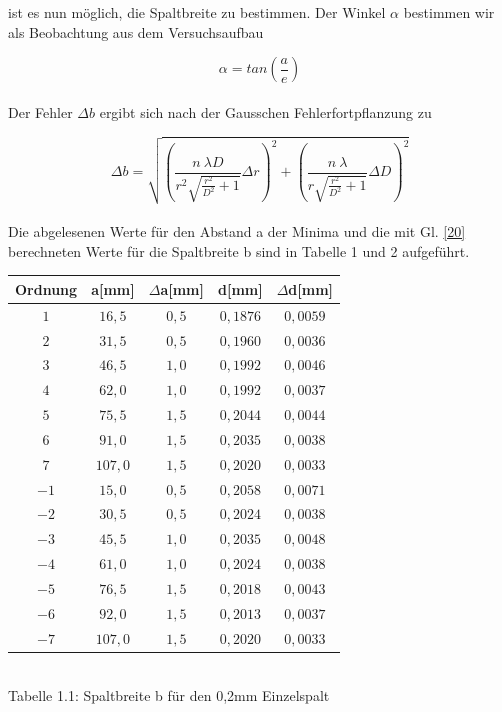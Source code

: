 \documentclass{article}
\begin{document}
 ist es nun möglich, die Spaltbreite zu bestimmen. Der Winkel \(\alpha \) bestimmen wir als Beobachtung aus dem Versuchsaufbau

\begin{equation}
\alpha =tan \left( \frac {a}{e} \right )
\end{equation}\\

Der Fehler \(\Delta b \) ergibt sich nach der Gausschen Fehlerfortpflanzung zu

\begin{equation}
\Delta b =  \sqrt{\left(\frac{n \ \lambda D}{r^2 \sqrt{\frac{r^2}{D^2} + 1}} \Delta r\right)^2 + \left( \frac{n \ \lambda}{r\sqrt{\frac{r^2}{D^2} + 1}} \Delta D\right)^2}
\end{equation}\\

Die abgelesenen Werte für den Abstand a der Minima und die mit Gl. \eqref{20} berechneten Werte für die Spaltbreite b sind in Tabelle 1 und 2 aufgeführt.

\begin{center}
\begin{tabular}{|c|c|c|c|c|}
\hline
Ordnung & a[mm] & \(\Delta \)a[mm] & d[mm] & \(\Delta \)d[mm]\\
\hline
\( 1\) &	\(16,5\) &	\(0,5\) &	\(0,1876\) &	\(0,0059\)  \\ 
\( 2\) &	\(31,5\) &	\(0,5\) &	\(0,1960\) &	\(0,0036\)  \\  
\( 3\) &	\(46,5\) &	\(1,0\) &	\(0,1992\) &	\(0,0046\)  \\  
\( 4\) &	\(62,0\) &	\(1,0\) &	\(0,1992\) &	\(0,0037\)  \\    
\( 5\) &	\(75,5\) &	\(1,5\) &	\(0,2044\) &	\(0,0044\)  \\  
\( 6\) &	\(91,0\) &	\(1,5\) &	\(0,2035\) &	\(0,0038\)  \\  
\( 7\) &	\(107,0\) &	\(1,5\) &	\(0,2020\) &	\(0,0033\)  \\  
\(-1\) &	\(15,0\) &	\(0,5\) &	\(0,2058\) &	\(0,0071\)  \\ 
\(-2\) &	\(30,5\) &	\(0,5\) &	\(0,2024\) &	\(0,0038\)  \\  
\(-3\) &	\(45,5\) &	\(1,0\) &	\(0,2035\) &	\(0,0048\)  \\
\(-4\) &	\(61,0\) &	\(1,0\) &	\(0,2024\) &	\(0,0038\)  \\
\(-5\) &	\(76,5\) &	\(1,5\) &	\(0,2018\) &	\(0,0043\)  \\
\(-6\) &	\(92,0\) &	\(1,5\) &	\(0,2013\) &	\(0,0037\)  \\  
\(-7\) &	\(107,0\) &	\(1,5\) &	\(0,2020\) &	\(0,0033\)  \\  
\hline
\end{tabular}\\
Tabelle 1.1: Spaltbreite b für den 0,2mm Einzelspalt
\end{center}
\end{document}
